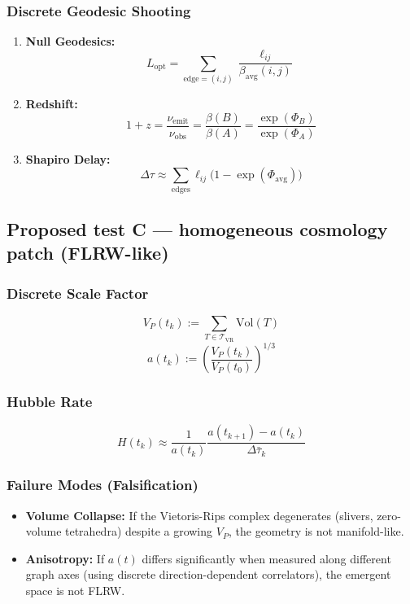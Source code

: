 \documentclass[reprint, amsmath, amssymb, aps, prd]{revtex4-2}
\begin{document}
\subsubsection{Discrete Geodesic Shooting}
\begin{enumerate}
    \item \textbf{Null Geodesics:}
    \begin{equation}
    L_{\text{opt}} = \sum_{\text{edge}=(i,j)} \frac{\ell_{ij}}{\beta_{\text{avg}}(i,j)}
    \end{equation}
    \item \textbf{Redshift:}
    \begin{equation}
    1+z = \frac{\nu_{\mathrm{emit}}}{\nu_{\mathrm{obs}}}
    = \frac{\beta(B)}{\beta(A)} = \frac{\exp(\Phi_B)}{\exp(\Phi_A)}
    \end{equation}
    \item \textbf{Shapiro Delay:}
    \begin{equation}
    \Delta \tau \approx \sum_{\text{edges}} \ell_{ij} \big(1 - \exp(\Phi_{\text{avg}})\big)
    \end{equation}
\end{enumerate}

\subsection{Proposed test C --- homogeneous cosmology patch (FLRW-like)}
\subsubsection{Discrete Scale Factor}
\begin{equation}
V_P(t_k) := \sum_{T \in \mathcal{T}_{\text{VR}}} \text{Vol}(T)
\end{equation}
\begin{equation}
a(t_k) := \left( \frac{V_P(t_k)}{V_P(t_0)} \right)^{1/3}
\end{equation}

\subsubsection{Hubble Rate}
\begin{equation}
H(t_k) \approx \frac{1}{a(t_k)} \frac{a(t_{k+1}) - a(t_k)}{\Delta \bar{\tau}_k}
\end{equation}

\subsubsection{Failure Modes (Falsification)}
\begin{itemize}
    \item \textbf{Volume Collapse:} If the Vietoris-Rips complex degenerates (slivers, zero-volume tetrahedra) despite a growing $V_P$, the geometry is not manifold-like.
    \item \textbf{Anisotropy:} If $a(t)$ differs significantly when measured along different graph axes (using discrete direction-dependent correlators), the emergent space is not FLRW.
\end{itemize}
\end{document}
